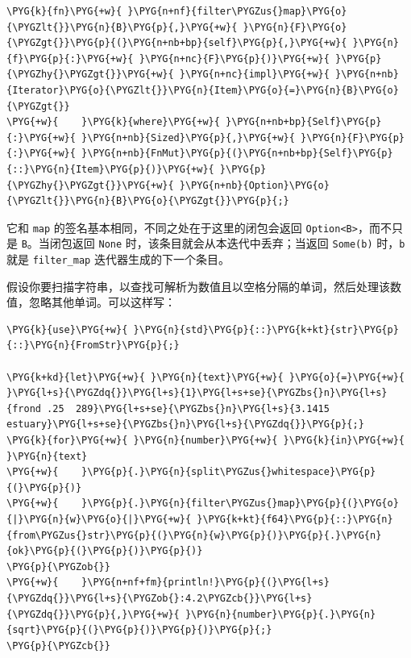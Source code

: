 \begin{Verbatim}[commandchars=\\\{\},breaklines=true,breakanywhere=true,fontsize=\codefont,xleftmargin=17bp]
\PYG{k}{fn}\PYG{+w}{ }\PYG{n+nf}{filter\PYGZus{}map}\PYG{o}{\PYGZlt{}}\PYG{n}{B}\PYG{p}{,}\PYG{+w}{ }\PYG{n}{F}\PYG{o}{\PYGZgt{}}\PYG{p}{(}\PYG{n+nb+bp}{self}\PYG{p}{,}\PYG{+w}{ }\PYG{n}{f}\PYG{p}{:}\PYG{+w}{ }\PYG{n+nc}{F}\PYG{p}{)}\PYG{+w}{ }\PYG{p}{\PYGZhy{}\PYGZgt{}}\PYG{+w}{ }\PYG{n+nc}{impl}\PYG{+w}{ }\PYG{n+nb}{Iterator}\PYG{o}{\PYGZlt{}}\PYG{n}{Item}\PYG{o}{=}\PYG{n}{B}\PYG{o}{\PYGZgt{}}
\PYG{+w}{    }\PYG{k}{where}\PYG{+w}{ }\PYG{n+nb+bp}{Self}\PYG{p}{:}\PYG{+w}{ }\PYG{n+nb}{Sized}\PYG{p}{,}\PYG{+w}{ }\PYG{n}{F}\PYG{p}{:}\PYG{+w}{ }\PYG{n+nb}{FnMut}\PYG{p}{(}\PYG{n+nb+bp}{Self}\PYG{p}{::}\PYG{n}{Item}\PYG{p}{)}\PYG{+w}{ }\PYG{p}{\PYGZhy{}\PYGZgt{}}\PYG{+w}{ }\PYG{n+nb}{Option}\PYG{o}{\PYGZlt{}}\PYG{n}{B}\PYG{o}{\PYGZgt{}}\PYG{p}{;}
\end{Verbatim}

它和 \texttt{map} 的签名基本相同，不同之处在于这里的闭包会返回 \texttt{Option<B>}，而不只是 \texttt{B}。当闭包返回 \texttt{None} 时，该条目就会从本迭代中丢弃；当返回 \texttt{Some(b)} 时，\texttt{b} 就是 \texttt{filter\_map} 迭代器生成的下一个条目。

假设你要扫描字符串，以查找可解析为数值且以空格分隔的单词，然后处理该数值，忽略其他单词。可以这样写：

\begin{Verbatim}[commandchars=\\\{\},breaklines=true,breakanywhere=true,fontsize=\codefont,xleftmargin=17bp]
\PYG{k}{use}\PYG{+w}{ }\PYG{n}{std}\PYG{p}{::}\PYG{k+kt}{str}\PYG{p}{::}\PYG{n}{FromStr}\PYG{p}{;}

\PYG{k+kd}{let}\PYG{+w}{ }\PYG{n}{text}\PYG{+w}{ }\PYG{o}{=}\PYG{+w}{ }\PYG{l+s}{\PYGZdq{}}\PYG{l+s}{1}\PYG{l+s+se}{\PYGZbs{}n}\PYG{l+s}{frond .25  289}\PYG{l+s+se}{\PYGZbs{}n}\PYG{l+s}{3.1415 estuary}\PYG{l+s+se}{\PYGZbs{}n}\PYG{l+s}{\PYGZdq{}}\PYG{p}{;}
\PYG{k}{for}\PYG{+w}{ }\PYG{n}{number}\PYG{+w}{ }\PYG{k}{in}\PYG{+w}{ }\PYG{n}{text}
\PYG{+w}{    }\PYG{p}{.}\PYG{n}{split\PYGZus{}whitespace}\PYG{p}{(}\PYG{p}{)}
\PYG{+w}{    }\PYG{p}{.}\PYG{n}{filter\PYGZus{}map}\PYG{p}{(}\PYG{o}{|}\PYG{n}{w}\PYG{o}{|}\PYG{+w}{ }\PYG{k+kt}{f64}\PYG{p}{::}\PYG{n}{from\PYGZus{}str}\PYG{p}{(}\PYG{n}{w}\PYG{p}{)}\PYG{p}{.}\PYG{n}{ok}\PYG{p}{(}\PYG{p}{)}\PYG{p}{)}
\PYG{p}{\PYGZob{}}
\PYG{+w}{    }\PYG{n+nf+fm}{println!}\PYG{p}{(}\PYG{l+s}{\PYGZdq{}}\PYG{l+s}{\PYGZob{}:4.2\PYGZcb{}}\PYG{l+s}{\PYGZdq{}}\PYG{p}{,}\PYG{+w}{ }\PYG{n}{number}\PYG{p}{.}\PYG{n}{sqrt}\PYG{p}{(}\PYG{p}{)}\PYG{p}{)}\PYG{p}{;}
\PYG{p}{\PYGZcb{}}
\end{Verbatim}

